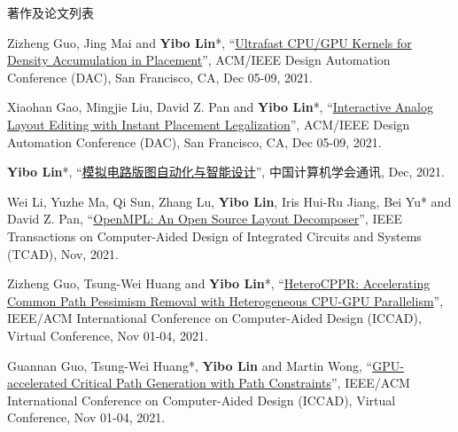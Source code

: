 \begin{rSection}{著作及论文列表}
\begin{description}[font=\normalfont, rightmargin=2em]
{}
            

\item[{[C81]}]{
        Zizheng Guo, Jing Mai and \textbf{Yibo Lin}*, 
    ``\href{https://doi.org/10.1109/DAC18074.2021.9586149}{Ultrafast CPU/GPU Kernels for Density Accumulation in Placement}'', 
    ACM/IEEE Design Automation Conference (DAC), San Francisco, CA, Dec 05-09, 2021.
    
}
            

\item[{[C80]}]{
        Xiaohan Gao, Mingjie Liu, David Z. Pan and \textbf{Yibo Lin}*, 
    ``\href{https://doi.org/10.1109/DAC18074.2021.9586234}{Interactive Analog Layout Editing with Instant Placement Legalization}'', 
    ACM/IEEE Design Automation Conference (DAC), San Francisco, CA, Dec 05-09, 2021.
    
}
            

\item[{[J79]}]{
        \textbf{Yibo Lin}*, 
    ``\href{https://dl.ccf.org.cn/article/articleDetail.html?type=xhtx_thesis&_ack=1&id=5743150191429632}{模拟电路版图自动化与智能设计}'', 
    中国计算机学会通讯, Dec, 2021.
    
}
            

\item[{[J78]}]{
        Wei Li, Yuzhe Ma, Qi Sun, Zhang Lu, \textbf{Yibo Lin}, Iris Hui-Ru Jiang, Bei Yu* and David Z. Pan, 
    ``\href{https://doi.org/10.1109/TCAD.2020.3042175}{OpenMPL: An Open Source Layout Decomposer}'', 
    IEEE Transactions on Computer-Aided Design of Integrated Circuits and Systems (TCAD), Nov, 2021.
    
}
            

\item[{[C77]}]{
        Zizheng Guo, Tsung-Wei Huang and \textbf{Yibo Lin}*, 
    ``\href{https://doi.org/10.1109/ICCAD51958.2021.9643457}{HeteroCPPR: Accelerating Common Path Pessimism Removal with Heterogeneous CPU-GPU Parallelism}'', 
    IEEE/ACM International Conference on Computer-Aided Design (ICCAD), Virtual Conference, Nov 01-04, 2021.
    
}
            

\item[{[C76]}]{
        Guannan Guo, Tsung-Wei Huang*, \textbf{Yibo Lin} and Martin Wong, 
    ``\href{https://doi.org/10.1109/ICCAD51958.2021.9643504}{GPU-accelerated Critical Path Generation with Path Constraints}'', 
    IEEE/ACM International Conference on Computer-Aided Design (ICCAD), Virtual Conference, Nov 01-04, 2021.
    
}
\end{description}
\end{rSection}
